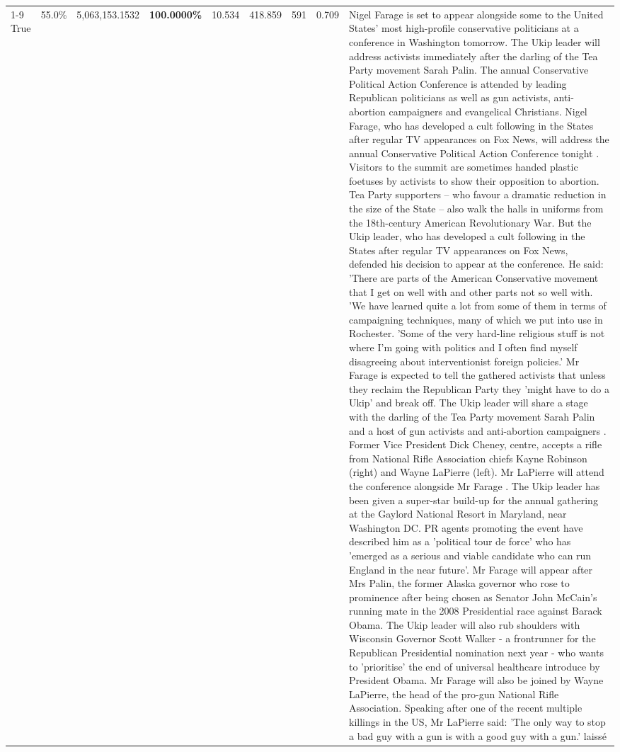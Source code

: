\begin{table}[H]
\begin{tabular}{lllrlllll}
\cline{1-9}
True & 55.0\% & 5,063,153.1532 & \bfseries \color{red} 100.0000\% & 10.534 & 418.859 & 591 & 0.709 & Nigel Farage is set to appear alongside some to the United States' most high-profile conservative politicians at a conference in Washington tomorrow. The Ukip leader will address activists immediately after the darling of the Tea Party movement Sarah Palin. The annual Conservative Political Action Conference is attended by leading Republican politicians as well as gun activists, anti-abortion campaigners and evangelical Christians. Nigel Farage, who has developed a cult following in the States after regular TV appearances on Fox News, will address the annual Conservative Political Action Conference tonight . Visitors to the summit are sometimes handed plastic foetuses by activists to show their opposition to abortion. Tea Party supporters – who favour a dramatic reduction in the size of the State – also walk the halls in uniforms from the 18th-century American Revolutionary War. But the Ukip leader, who has developed a cult following in the States after regular TV appearances on Fox News, defended his decision to appear at the conference. He said: 'There are parts of the American Conservative movement that I get on well with and other parts not so well with. 'We have learned quite a lot from some of them in terms of campaigning techniques, many of which we put into use in Rochester. 'Some of the very hard-line religious stuff is not where I'm going with politics and I often find myself disagreeing about interventionist foreign policies.' Mr Farage is expected to tell the gathered activists that unless they reclaim the Republican Party they 'might have to do a Ukip' and break off. The Ukip leader will share a stage with the darling of the Tea Party movement Sarah Palin and a host of gun activists and anti-abortion campaigners . Former Vice President Dick Cheney, centre, accepts a rifle from National Rifle Association chiefs Kayne Robinson (right) and Wayne LaPierre (left). Mr LaPierre will attend the conference alongside Mr Farage . The Ukip leader has been given a super-star build-up for the annual gathering at the Gaylord National Resort in Maryland, near Washington DC. PR agents promoting the event have described him as a 'political tour de force' who has 'emerged as a serious and viable candidate who can run England in the near future'. Mr Farage will appear after Mrs Palin, the former Alaska governor who rose to prominence after being chosen as Senator John McCain's running mate in the 2008 Presidential race against Barack Obama. The Ukip leader will also rub shoulders with Wisconsin Governor Scott Walker - a frontrunner for the Republican Presidential nomination next year - who wants to 'prioritise' the end of universal healthcare introduce by President Obama. Mr Farage will also be joined by Wayne LaPierre, the head of the pro-gun National Rifle Association. Speaking after one of the recent multiple killings in the US, Mr LaPierre said: 'The only way to stop a bad guy with a gun is with a good guy with a gun.' laissé \\

\end{tabular}
\end{table}
